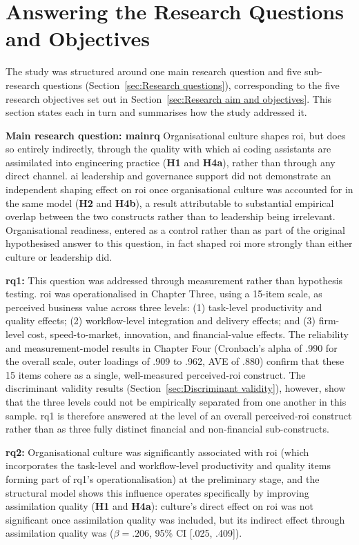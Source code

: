 \section{Answering the Research Questions and Objectives}
\label{sec:Answering the Research Questions}
The study was structured around one main research question and five sub-research questions (Section~\ref{sec:Research questions}), corresponding to the five research objectives set out in Section~\ref{sec:Research aim and objectives}. This section states each in turn and summarises how the study addressed it.

\textbf{Main research question: \gls{mainrq}} Organisational culture shapes \gls{roi}, but does so entirely indirectly, through the quality with which \gls{ai} coding assistants are assimilated into engineering practice (\textbf{H1} and \textbf{H4a}), rather than through any direct channel. \gls{ai} leadership and governance support did not demonstrate an independent shaping effect on \gls{roi} once organisational culture was accounted for in the same model (\textbf{H2} and \textbf{H4b}), a result attributable to substantial empirical overlap between the two constructs rather than to leadership being irrelevant. Organisational readiness, entered as a control rather than as part of the original hypothesised answer to this question, in fact shaped \gls{roi} more strongly than either culture or leadership did.

\textbf{\gls{rq1}:} This question was addressed through measurement rather than hypothesis testing. \gls{roi} was operationalised in Chapter Three, using a 15-item scale, as perceived business value across three levels: (1) task-level productivity and quality effects; (2) workflow-level integration and delivery effects; and (3) firm-level cost, speed-to-market, innovation, and financial-value effects. The reliability and measurement-model results in Chapter Four (Cronbach's alpha of .990 for the overall scale, outer loadings of .909 to .962, AVE of .880) confirm that these 15 items cohere as a single, well-measured perceived-\gls{roi} construct. The discriminant validity results (Section~\ref{sec:Discriminant validity}), however, show that the three levels could not be empirically separated from one another in this sample. \gls{rq1} is therefore answered at the level of an overall perceived-\gls{roi} construct rather than as three fully distinct financial and non-financial sub-constructs.

\textbf{\gls{rq2}:} Organisational culture was significantly associated with \gls{roi} (which incorporates the task-level and workflow-level productivity and quality items forming part of \gls{rq1}'s operationalisation) at the preliminary stage, and the structural model shows this influence operates specifically by improving assimilation quality (\textbf{H1} and \textbf{H4a}): culture's direct effect on \gls{roi} was not significant once assimilation quality was included, but its indirect effect through assimilation quality was ($\beta = .206$, 95\% CI [.025, .409]).

